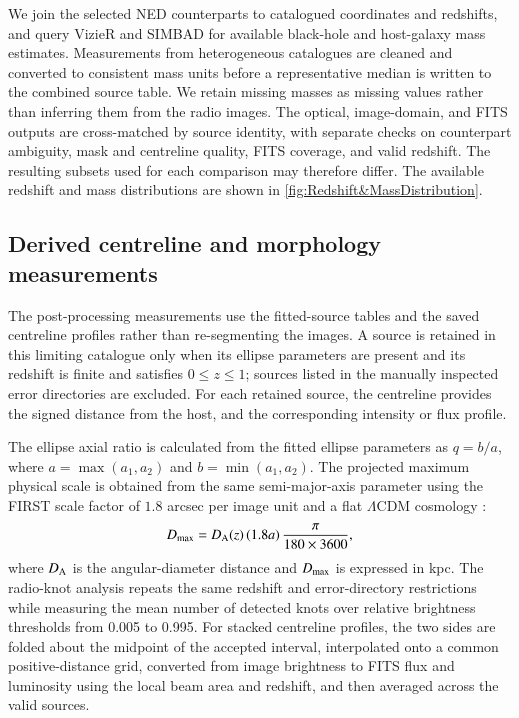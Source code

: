 \documentclass{aa}
\begin{document}
We join the selected NED counterparts to catalogued coordinates and redshifts, and query VizieR and SIMBAD for available black-hole and host-galaxy mass estimates. Measurements from heterogeneous catalogues are cleaned and converted to consistent mass units before a representative median is written to the combined source table. We retain missing masses as missing values rather than inferring them from the radio images. The optical, image-domain, and FITS outputs are cross-matched by source identity, with separate checks on counterpart ambiguity, mask and centreline quality, FITS coverage, and valid redshift. The resulting subsets used for each comparison may therefore differ. The available redshift and mass distributions are shown in \autoref{fig:Redshift&MassDistribution}.

\subsection{Derived centreline and morphology measurements}
\label{sec:derived_measurements}

The post-processing measurements use the fitted-source tables and the saved centreline profiles rather than re-segmenting the images. A source is retained in this limiting catalogue only when its ellipse parameters are present and its redshift is finite and satisfies $0\leq z\leq1$; sources listed in the manually inspected error directories are excluded. For each retained source, the centreline provides the signed distance from the host, and the corresponding intensity or flux profile.

The ellipse axial ratio is calculated from the fitted ellipse parameters as $q=b/a$, where $a=\max(a_1,a_2)$ and $b=\min(a_1,a_2)$. The projected maximum physical scale is obtained from the same semi-major-axis parameter using the FIRST scale factor of $1.8$ arcsec per image unit and a flat $\Lambda$CDM cosmology :
\begin{equation}
D_{\rm max}=D_{\rm A}(z)\,(1.8a)\,\frac{\pi}{180\times3600},
\end{equation}
where $D_{\rm A}$ is the angular-diameter distance and $D_{\rm max}$ is expressed in kpc. The radio-knot analysis repeats the same redshift and error-directory restrictions while measuring the mean number of detected knots over relative brightness thresholds from 0.005 to 0.995. For stacked centreline profiles, the two sides are folded about the midpoint of the accepted interval, interpolated onto a common positive-distance grid, converted from image brightness to FITS flux and luminosity using the local beam area and redshift, and then averaged across the valid sources.
\end{document}
